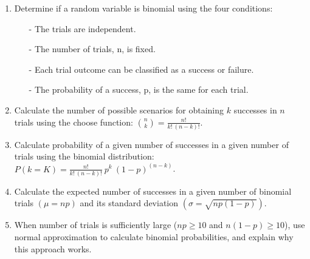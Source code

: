 \documentclass[11pt]{article}
\begin{document}
%

\vspace{0.48cm}

%

\begin{enumerate}[resume]
\renewcommand\labelenumi{\textcolor{oiB}{\textbf{LO \theenumi.}}}

\item Determine if a random variable is binomial using the four conditions:
\begin{itemize}
\item[-] The trials are independent. 
\item[-] The number of trials, n, is fixed. 
\item[-] Each trial outcome can be classified as a success or failure. 
\item[-] The probability of a success, p, is the same for each trial. 
\end{itemize}

\item Calculate the number of possible scenarios for obtaining $k$ successes in $n$ trials using the choose function: ${n \choose k} = \frac{n!}{k!~(n - k)!}$.

\item Calculate probability of a given number of successes in a given number of trials using the binomial distribution: $P(k = K) = \frac{n!}{k!~(n - k)!}~p^k~(1-p)^{(n - k)}$. 

\item Calculate the expected number of successes in a given number of binomial trials $(\mu = np)$ and its standard deviation $(\sigma = \sqrt{np(1-p)})$.

\item When number of trials is sufficiently large ($np \ge 10$ and $n(1-p) \ge 10$), use normal approximation to calculate binomial probabilities, and explain why this approach works.

\end{enumerate}

%
\end{document}
